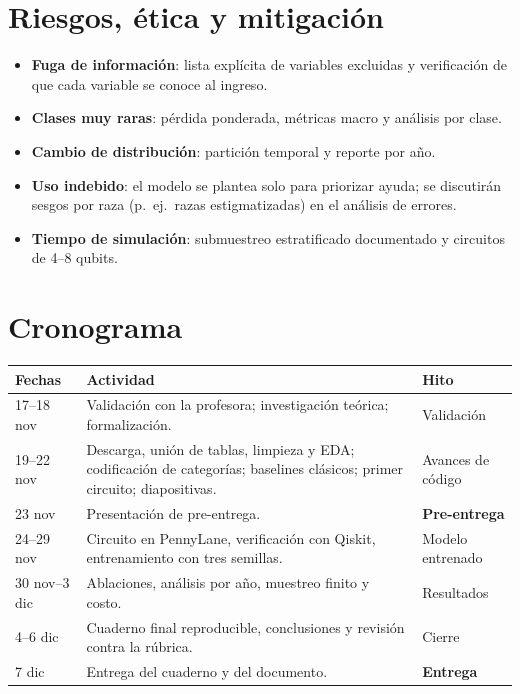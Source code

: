 \documentclass[11pt,letterpaper]{article}
\begin{document}
\section{Riesgos, ética y mitigación}
\begin{itemize}[leftmargin=*]
\item \textbf{Fuga de información}: lista explícita de variables excluidas y verificación de que cada
variable se conoce al ingreso.
\item \textbf{Clases muy raras}: pérdida ponderada, métricas macro y análisis por clase.
\item \textbf{Cambio de distribución}: partición temporal y reporte por año.
\item \textbf{Uso indebido}: el modelo se plantea solo para priorizar ayuda; se discutirán sesgos por
raza (p.\ ej.\ razas estigmatizadas) en el análisis de errores.
\item \textbf{Tiempo de simulación}: submuestreo estratificado documentado y circuitos de 4--8 qubits.
\end{itemize}

\section{Cronograma}
\begin{table}[H]
\centering\small
\begin{tabular}{@{}p{3.0cm}p{9.2cm}p{2.3cm}@{}}
\toprule
Fechas & Actividad & Hito \\ \midrule
17--18 nov & Validación con la profesora; investigación teórica; formalización. & Validación \\
19--22 nov & Descarga, unión de tablas, limpieza y EDA; codificación de categorías; baselines
clásicos; primer circuito; diapositivas. & Avances de código \\
23 nov & Presentación de pre-entrega. & \textbf{Pre-entrega} \\
24--29 nov & Circuito en PennyLane, verificación con Qiskit, entrenamiento con tres semillas. & Modelo entrenado \\
30 nov--3 dic & Ablaciones, análisis por año, muestreo finito y costo. & Resultados \\
4--6 dic & Cuaderno final reproducible, conclusiones y revisión contra la rúbrica. & Cierre \\
7 dic & Entrega del cuaderno y del documento. & \textbf{Entrega} \\
\bottomrule
\end{tabular}
\end{table}
\end{document}
